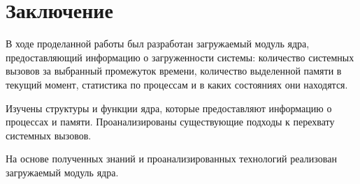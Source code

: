 \chapter*{Заключение}


В ходе проделанной работы был разработан загружаемый модуль ядра, предоставляющий информацию о загруженности системы: количество системных вызовов за выбранный промежуток времени, количество выделенной памяти в текущий момент, статистика по процессам и в каких состояниях они находятся.

Изучены структуры и функции ядра, которые предоставляют информацию о процессах и памяти. Проанализированы существующие подходы к перехвату системных вызовов. 

На основе полученных знаний и проанализированных технологий реализован загружаемый модуль ядра.